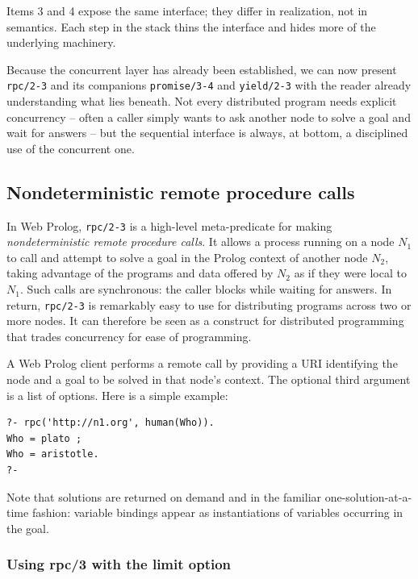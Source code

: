 \noindent Items 3 and 4 expose the same interface; they differ in realization, not in semantics. Each step in the stack thins the interface and hides more of the underlying machinery.

Because the concurrent layer has already been established, we can now present \texttt{rpc/2-3} and its companions \texttt{promise/3-4} and \texttt{yield/2-3} with the reader already understanding what lies beneath. Not every distributed program needs explicit concurrency -- often a caller simply wants to ask another node to solve a goal and wait for answers -- but the sequential interface is always, at bottom, a disciplined use of the concurrent one.


\subsection{Nondeterministic remote procedure calls}\label{sec:non-deterministic-procedure-calls}

In Web Prolog, \texttt{rpc/2-3} is a high-level meta-predicate for making \emph{nondeterministic remote procedure calls}. It allows a process running on a node $N_1$ to call and attempt to solve a goal in the Prolog context of another node $N_2$, taking advantage of the programs and data offered by $N_2$ as if they were local to $N_1$. Such calls are synchronous: the caller blocks while waiting for answers. In return, \texttt{rpc/2-3} is remarkably easy to use for distributing programs across two or more nodes. It can therefore be seen as a construct for distributed programming that trades concurrency for ease of programming.

A Web Prolog client performs a remote call by providing a URI identifying the node and a goal to be solved in that node's context. The optional third argument is a list of options. Here is a simple example:

\begin{verbatim}
?- rpc('http://n1.org', human(Who)).
Who = plato ;
Who = aristotle.
?-
\end{verbatim}

\noindent Note that solutions are returned on demand and in the familiar one-solution-at-a-time fashion: variable bindings appear as instantiations of variables occurring in the goal.

\subsubsection{Using rpc/3 with the limit option}\label{sec:rpc-with-limit}

